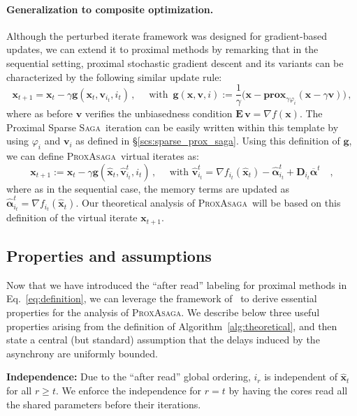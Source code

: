 \documentclass{article}
\newcommand{\Econd}{\mathbf{E}}
\def\prox{{\mathbf{prox}}}
\newcommand{\PASAGA}{\textsc{ProxAsaga}}
\newcommand{\SAGA}{\textsc{Saga}}
\def\xx{{\boldsymbol x}}
\def\vv{{\boldsymbol v}}
\begin{document}
\paragraph{Generalization to composite optimization.}
Although the perturbed iterate framework was designed for gradient-based updates, we can extend it to proximal methods by remarking that in the sequential setting, proximal stochastic gradient descent and its variants can be characterized by the following similar update rule:
\begin{equation}\label{eq:def_grad_mapping}
\xx_{t+1} = \xx_t - \gamma {\boldsymbol g}(\xx_t, \vv_{i_t}, {i_t}) \,,\quad \text{ with }\, {\boldsymbol g}(\xx, \vv, i) := \textstyle\frac{1}{\gamma}\big(\xx - \prox_{\gamma \varphi_i}(\xx - \gamma \vv)\big)\,,
\end{equation}
where as before $\vv$ verifies the unbiasedness condition $\Econd\, \vv = \nabla f(\xx)$.
The Proximal Sparse \SAGA\ iteration can be easily written within this template by using $\varphi_{i}$ and $\vv_i$ as defined in \S\ref{scs:sparse_prox_saga}. Using this definition of $\boldsymbol g$,
we can define \PASAGA\ virtual iterates as:
\begin{equation}\label{eq:definition}
\xx_{t+1} := \xx_t - \gamma \boldsymbol g(\hat{\xx}_t, \hat\vv^t_{i_t}, {i_t}) \,,\quad\text{ with } \hat{\vv}_{i_t}^t = \nabla f_{i_t}(\hat \xx_t) - \hat{{\boldsymbol\alpha}}^t_{i_t} + {\boldsymbol D}_{i_t} \overline{{\boldsymbol\alpha}}^t\quad,
\end{equation}
 where as in the sequential case, the memory terms are updated as
$\hat {\boldsymbol\alpha}^t_{i_t} = \nabla f_{i_t}(\hat \xx_t)$. Our theoretical analysis of \PASAGA\ will be based on this definition of the virtual iterate $\xx_{t+1}$.

\subsection{Properties and assumptions}
Now that we have introduced the ``after read'' labeling for proximal methods in Eq.~\eqref{eq:definition}, we can leverage the framework of~\citet[Section 3.3]{leblond2016Asaga} to derive essential properties for the analysis of \PASAGA.
We describe below three useful properties arising from the definition of Algorithm~\ref{alg:theoretical}, and then state a central (but standard) assumption that the delays induced by the asynchrony are uniformly bounded. 

{\bfseries Independence:} Due to the ``after read'' global ordering, $i_r$ is independent of $\hat{\xx}_t$ for all $r \geq t$. We enforce the independence for $r = t$ by having the cores read all the shared parameters before their iterations.
\end{document}
